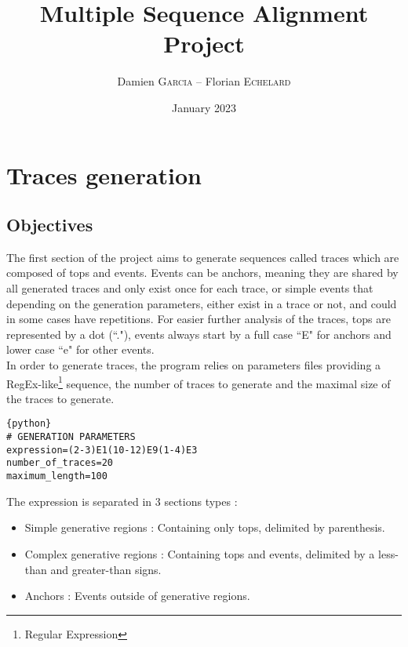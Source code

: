 \documentclass[12pt,a4paper]{article}
\begin{document}
	
\title{Multiple Sequence Alignment Project}
\author{Damien \textsc{Garcia} -- Florian \textsc{Echelard}}
\date{January 2023}

\begin{tcolorbox}
	\maketitle
\end{tcolorbox}

\tableofcontents
\listoffigures
\listoftables
	
\thispagestyle{empty}
\pagebreak


\section{Traces generation}

\subsection{Objectives}

The first section of the project aims to generate sequences called traces which are composed of tops and events. Events can be anchors, meaning they are shared by all generated traces and only exist once for each trace, or simple events that depending on the generation parameters, either exist in a trace or not, and could in some cases have repetitions. For easier further analysis of the traces, tops are represented by a dot (``."), events always start by a full case ``E" for anchors and lower case ``e" for other events.\\

In order to generate traces, the program relies on parameters files providing a RegEx-like\footnote{Regular Expression} sequence, the number of traces to generate and the maximal size of the traces to generate.

\begin{lstlisting}{python}
# GENERATION PARAMETERS
expression=(2-3)E1(10-12)E9(1-4)E3
number_of_traces=20
maximum_length=100
\end{lstlisting}

The expression is separated in 3 sections types :
\begin{itemize}
	\item Simple generative regions : Containing only tops, delimited by parenthesis.
	\item Complex generative regions : Containing tops and events, delimited by a less-than and greater-than signs.
	\item Anchors : Events outside of generative regions.
\end{itemize}
\end{document}
